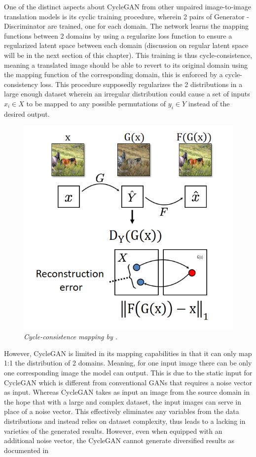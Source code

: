 \documentclass[12pt]{report}
\begin{document}
One of the distinct aspects about CycleGAN\cite{cycle-gan} from other unpaired image-to-image translation models is its cyclic training procedure, wherein 2 pairs of Generator - Discriminator are trained, one for each domain. The network learns the mapping functions between 2 domains by using a regularize loss function to ensure a regularized latent space between each domain (discussion on regular latent space will be in the next section of this chapter). This training is thus cycle-consistence, meaning a translated image should be able to revert to its original domain using the mapping function of the corresponding domain, this is enforced by a cycle-consistency loss. This procedure supposedly regularizes the 2 distributions in a large enough dataset wherein an irregular distribution could cause a set of inputs $x_i$$\in$$X$ to be mapped to any possible permutations of $y_i$$\in$$Y$ instead of the desired output.

\begin{figure}[H]
	\centering
	\includegraphics[scale=0.8]{cycle-consistence}
	\caption{\textit{Cycle-consistence mapping by \cite{cycle-gan}.}}
	\label{fig:cycle-consistence}
\end{figure}

However, CycleGAN is limited in its mapping capabilities in that it can only map 1:1 the distribution of 2 domains. Meaning, for one input image there can be only one corresponding image the model can output. This is due to the static input for CycleGAN which is different from conventional GANs that requires a noise vector as input. Whereas CycleGAN takes as input an image from the source domain in the hope that with a large and complex dataset, the input images can serve in place of a noise vector. This effectively eliminates any variables from the data distributions and instead relies on dataset complexity, thus leads to a lacking in varieties of the generated results. However, even when equipped with an additional noise vector, the CycleGAN cannot generate diversified results as documented in \cite{augmented-cyclegan}
\end{document}
